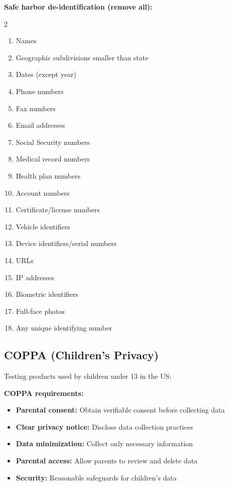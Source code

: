 \textbf{Safe harbor de-identification (remove all):}
\begin{multicols}{2}
\begin{enumerate}
    \item Names
    \item Geographic subdivisions smaller than state
    \item Dates (except year)
    \item Phone numbers
    \item Fax numbers
    \item Email addresses
    \item Social Security numbers
    \item Medical record numbers
    \item Health plan numbers
    \item Account numbers
    \item Certificate/license numbers
    \item Vehicle identifiers
    \item Device identifiers/serial numbers
    \item URLs
    \item IP addresses
    \item Biometric identifiers
    \item Full-face photos
    \item Any unique identifying number
\end{enumerate}
\end{multicols}

\subsection{COPPA (Children's Privacy)}

Testing products used by children under 13 in the US:

\textbf{COPPA requirements:}
\begin{itemize}
    \item \textbf{Parental consent:} Obtain verifiable consent before collecting data
    \item \textbf{Clear privacy notice:} Disclose data collection practices
    \item \textbf{Data minimization:} Collect only necessary information
    \item \textbf{Parental access:} Allow parents to review and delete data
    \item \textbf{Security:} Reasonable safeguards for children's data
\end{itemize}


